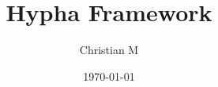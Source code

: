 \documentclass{beamer}
\title[Hypha]{Hypha Framework}
\author[Christian M]{Christian M}
\date[\today]{\today}
\begin{document}
\frame{
	\titlepage
}


\end{document}
